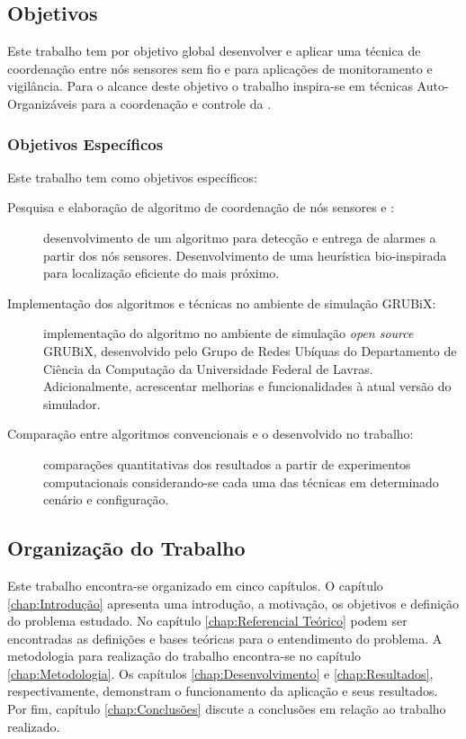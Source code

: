 \subsection{Objetivos}

Este trabalho tem por objetivo global desenvolver e aplicar uma técnica de
coordenação entre nós sensores sem fio e \uavs para aplicações de monitoramento
e vigilância. Para o alcance deste objetivo o trabalho inspira-se em técnicas
Auto-Organizáveis para a coordenação e controle da \rssf.

\subsubsection{Objetivos Específicos}

Este trabalho tem como objetivos específicos:

\begin{description}

	\item [Pesquisa e elaboração de algoritmo de coordenação de nós
sensores e \vants:] desenvolvimento de um algoritmo para detecção e entrega de
alarmes a partir dos nós sensores. Desenvolvimento de uma heurística
bio-inspirada para localização eficiente do \uav mais próximo.

	\item [Implementação dos algoritmos e técnicas no ambiente de simulação
GRUBiX:] implementação do algoritmo no ambiente de simulação
\emph{open source} GRUBiX, desenvolvido pelo Grupo de Redes Ubíquas do
Departamento de Ciência da Computação da Universidade Federal de Lavras.
Adicionalmente, acrescentar melhorias e funcionalidades à atual versão do
simulador.

	\item [Comparação entre algoritmos convencionais e o desenvolvido no
trabalho:] comparações quantitativas dos resultados a partir de experimentos
computacionais considerando-se cada uma das técnicas em determinado cenário e configuração.

\end{description}

%
\subsection{Organização do Trabalho}

Este trabalho encontra-se organizado em cinco capítulos. O capítulo
\ref{chap:Introdução} apresenta uma introdução, a motivação, os objetivos e
definição do problema estudado. No capítulo \ref{chap:Referencial Teórico} podem
ser encontradas as definições e bases teóricas para o entendimento do problema.
A metodologia para realização do trabalho encontra-se no capítulo
\ref{chap:Metodologia}. Os capítulos \ref{chap:Desenvolvimento} e
\ref{chap:Resultados}, respectivamente, demonstram o funcionamento da aplicação e seus resultados. Por fim, capítulo \ref{chap:Conclusões} discute a conclusões em relação ao trabalho realizado.


